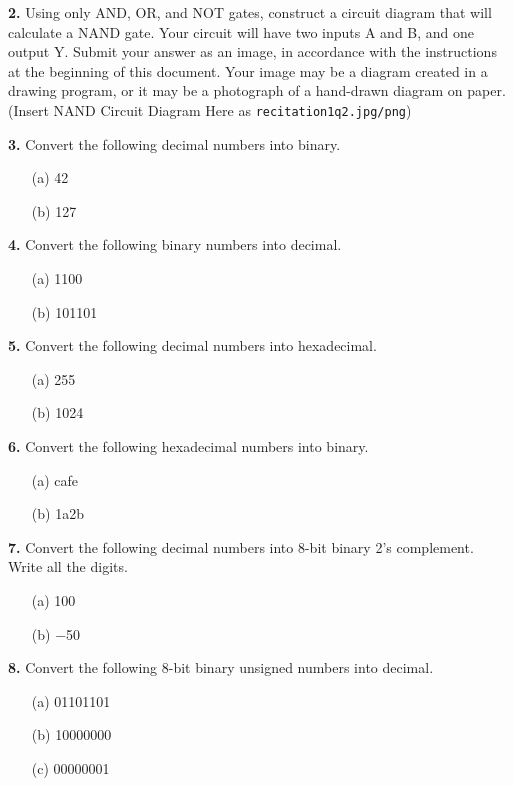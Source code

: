 \documentclass{article}
\begin{document}
\noindent\textbf{2.} Using only AND, OR, and NOT gates, construct a circuit diagram that will calculate a NAND gate. Your circuit will have two inputs A and B, and one output Y. Submit your answer as an image, in accordance with the instructions at the beginning of this document. Your image may be a diagram created in a drawing program, or it may be a photograph of a hand-drawn diagram on paper. (Insert NAND Circuit Diagram Here as \texttt{recitation1q2.jpg/png})


\noindent\textbf{3.} Convert the following decimal numbers into binary.
\begin{itemize}
    \item[(a)] 42
    \item[(b)] 127
\end{itemize}

\noindent\textbf{4.} Convert the following binary numbers into decimal.
\begin{itemize}
    \item[(a)] 1100
    \item[(b)] 101101
\end{itemize}

\noindent\textbf{5.} Convert the following decimal numbers into hexadecimal.
\begin{itemize}
    \item[(a)] 255
    \item[(b)] 1024
\end{itemize}

\noindent\textbf{6.} Convert the following hexadecimal numbers into binary.
\begin{itemize}
    \item[(a)] cafe
    \item[(b)] 1a2b
\end{itemize}

\noindent\textbf{7.} Convert the following decimal numbers into 8-bit binary 2’s complement. Write all the digits.
\begin{itemize}
    \item[(a)] 100
    \item[(b)] −50
\end{itemize}

\noindent\textbf{8.} Convert the following 8-bit binary unsigned numbers into decimal.
\begin{itemize}
    \item[(a)] 01101101
    \item[(b)] 10000000
    \item[(c)] 00000001
\end{itemize}
\end{document}
